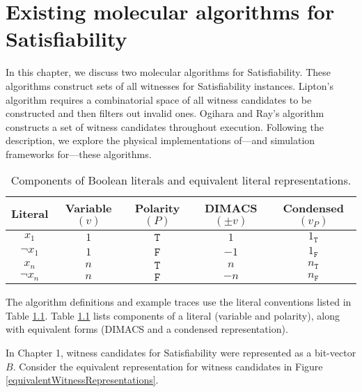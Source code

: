 \chapter{Existing molecular algorithms for {\sc Satisfiability}}


In this chapter, we discuss two molecular algorithms for {\sc Satisfiability}.  These algorithms construct sets of all witnesses for {\sc Satisfiability} instances.  Lipton's algorithm requires a combinatorial space of all witness candidates to be constructed and then filters out invalid ones.  Ogihara and Ray's algorithm constructs a set of witness candidates throughout execution.  Following the description, we explore the physical implementations of---and simulation frameworks for---these algorithms.

\begin{table}[htdp]
\caption{Components of Boolean literals and equivalent literal representations.}
\begin{center}
\begin{tabular}{| c | c | c | c | c |}
\hline
\textbf{Literal} & \textbf{Variable} $(v)$ & \textbf{Polarity} $(P)$ & \textbf{DIMACS} $(\pm v)$ & \textbf{Condensed} $(v_P)$ \\ \hline	
$x_1$ & $1$ & $\texttt{T}$ & $1$ & $1_{\texttt{T}}$ \\
$\neg x_1$ & $1$ & $\texttt{F}$ & $-1$ & $1_{\texttt{F}}$ \\
$x_n$ & $n$ & $\texttt{T}$ & $n$ & $n_{\texttt{T}}$ \\
$\neg x_n$ & $n$ & $\texttt{F}$ & $-n$ & $n_{\texttt{F}}$ \\ \hline
\end{tabular}
\end{center}
\label{equivalentLiteralTable}
\end{table}%

The algorithm definitions and example traces use the literal conventions listed in Table \ref{equivalentLiteralTable}.  Table \ref{equivalentLiteralTable} lists components of a literal (variable and polarity), along with equivalent forms (DIMACS and a condensed representation).  

In Chapter 1, witness candidates for {\sc Satisfiability} were represented as a bit-vector $B$.  Consider the equivalent representation for witness candidates in Figure \ref{equivalentWitnessRepresentations}.

